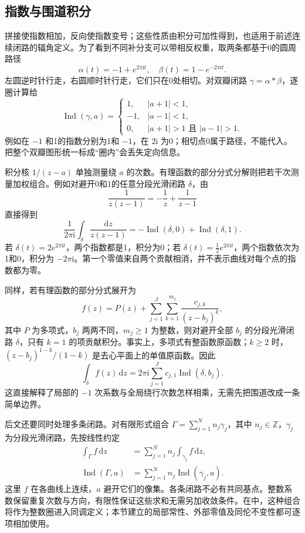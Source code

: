 \subsection{指数与围道积分}
\label{b3:subsec:100103}

拼接使指数相加，反向使指数变号；这些性质由积分可加性得到，也适用于前述连续闭路的辐角定义。为了看到不同补分支可以带相反权重，取两条都基于0的圆周路径
\[
 \alpha(t)=-1+e^{2\pi\mathrm i t},\quad
 \beta(t)=1-e^{-2\pi\mathrm i t}.
\]
左圆逆时针行走，右圆顺时针行走，它们只在0处相切。对双瓣闭路 \(\gamma=\alpha*\beta\)，逐圈计算给
\[
 \operatorname{Ind}(\gamma,a)=
 \begin{cases}
 1,&|a+1|<1,\\
 -1,&|a-1|<1,\\
 0,&|a+1|>1\text{ 且 }|a-1|>1.
 \end{cases}
\]
例如在 \(-1\) 和1的指数分别为1和 \(-1\)，在 \(2\mathrm i\) 为0；相切点0属于路径，不能代入。把整个双瓣图形统一标成“圈内”会丢失定向信息。

\ProseParagraphBreak
积分核 \(1/(z-a)\) 单独测量绕 \(a\) 的次数。有理函数的部分分式分解则把若干次测量加权组合。例如对避开0和1的任意分段光滑闭路 \(\delta\)，由
\[
 \frac1{z(z-1)}=-\frac1z+\frac1{z-1}
\]
直接得到
\[
 \frac1{2\pi\mathrm i}\int_\delta\frac{\mathrm dz}{z(z-1)}
 =-\operatorname{Ind}(\delta,0)+\operatorname{Ind}(\delta,1).
\]
若 \(\delta(t)=2e^{2\pi\mathrm i t}\)，两个指数都是1，积分为0；若 \(\delta(t)=\tfrac12e^{2\pi\mathrm i t}\)，两个指数依次为1和0，积分为 \(-2\pi\mathrm i\)。第一个零值来自两个贡献相消，并不表示曲线对每个点的指数都为零。

\ProseParagraphBreak
同样，若有理函数的部分分式展开为
\[
 f(z)=P(z)+\sum_{j=1}^J\sum_{k=1}^{m_j}
 \frac{c_{j,k}}{(z-b_j)^k},
\]
其中 \(P\) 为多项式，\(b_j\) 两两不同，\(m_j\ge1\) 为整数，则对避开全部 \(b_j\) 的分段光滑闭路 \(\delta\)，只有 \(k=1\) 的项贡献积分。事实上，多项式有整函数原函数；\(k\ge2\) 时，\((z-b_j)^{1-k}/(1-k)\) 是去心平面上的单值原函数。因此
\[
 \int_\delta f(z)\,\mathrm dz
 =2\pi\mathrm i\sum_{j=1}^J
 c_{j,1}\operatorname{Ind}(\delta,b_j).
\]
这直接解释了局部的 \(-1\) 次系数与全局绕行次数怎样相乘，无需先把围道改成一条简单边界。

\ProseParagraphBreak
后文还要同时处理多条闭路。对有限形式组合 \(\Gamma=\sum_{j=1}^N n_j\gamma_j\)，其中 \(n_j\in\mathbb Z\)，\(\gamma_j\) 为分段光滑闭路，先按线性约定
\[
 \begin{aligned}
 \int_\Gamma f\,\mathrm dz&=\sum_{j=1}^N n_j\int_{\gamma_j}f\,\mathrm dz,\\
 \operatorname{Ind}(\Gamma,a)&=\sum_{j=1}^N n_j\operatorname{Ind}(\gamma_j,a).
 \end{aligned}
\]
这里 \(f\) 在各曲线上连续，\(a\) 避开它们的像集。各条闭路不必有共同基点。整数系数保留重复次数与方向，有限性保证这些求和无需另加收敛条件。在中，这种组合将作为整数圈进入同调定义；本节建立的局部常性、外部零值及同伦不变性都可逐项相加使用。
